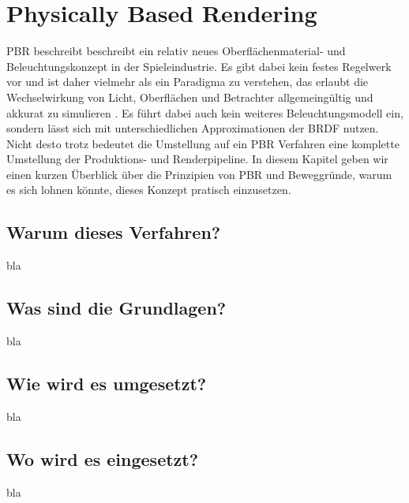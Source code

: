 \chapter{Physically Based Rendering}
\label{chap:pbr}

\acl{PBR} beschreibt beschreibt ein relativ neues Oberflächenmaterial- und Beleuchtungskonzept in der Spieleindustrie. Es gibt dabei kein festes Regelwerk vor und ist daher vielmehr als ein Paradigma zu verstehen, das erlaubt die Wechselwirkung von Licht, Oberflächen und Betrachter allgemeingültig und akkurat zu simulieren \parencite[Kapitel 1]{Rousiers2014}. Es führt dabei auch kein weiteres Beleuchtungsmodell ein, sondern lässt sich mit unterschiedlichen Approximationen der BRDF nutzen. Nicht desto trotz bedeutet die Umstellung auf ein \ac{PBR} Verfahren eine komplette Umstellung der Produktions- und Renderpipeline. In diesem Kapitel geben wir einen kurzen Überblick über die Prinzipien von \ac{PBR} und Beweggründe, warum es sich lohnen könnte, dieses Konzept pratisch einzusetzen.

\section{Warum dieses Verfahren?}
\label{sec:pbr-warum}
bla

\section{Was sind die Grundlagen?}
bla

\section{Wie wird es umgesetzt?}
bla

\section{Wo wird es eingesetzt?}
bla
